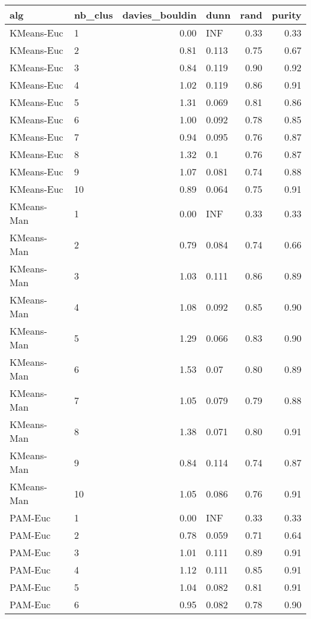 \begin{table}[ht]
\centering
\begin{tabular}{llrlrr}
  \hline
alg & nb\_clus & davies\_bouldin & dunn & rand & purity \\ 
  \hline
KMeans-Euc & 1 & 0.00 & INF & 0.33 & 0.33 \\ 
  KMeans-Euc & 2 & 0.81 & 0.113 & 0.75 & 0.67 \\ 
  KMeans-Euc & 3 & 0.84 & 0.119 & 0.90 & 0.92 \\ 
  KMeans-Euc & 4 & 1.02 & 0.119 & 0.86 & 0.91 \\ 
  KMeans-Euc & 5 & 1.31 & 0.069 & 0.81 & 0.86 \\ 
  KMeans-Euc & 6 & 1.00 & 0.092 & 0.78 & 0.85 \\ 
  KMeans-Euc & 7 & 0.94 & 0.095 & 0.76 & 0.87 \\ 
  KMeans-Euc & 8 & 1.32 & 0.1 & 0.76 & 0.87 \\ 
  KMeans-Euc & 9 & 1.07 & 0.081 & 0.74 & 0.88 \\ 
  KMeans-Euc & 10 & 0.89 & 0.064 & 0.75 & 0.91 \\ 
  KMeans-Man & 1 & 0.00 & INF & 0.33 & 0.33 \\ 
  KMeans-Man & 2 & 0.79 & 0.084 & 0.74 & 0.66 \\ 
  KMeans-Man & 3 & 1.03 & 0.111 & 0.86 & 0.89 \\ 
  KMeans-Man & 4 & 1.08 & 0.092 & 0.85 & 0.90 \\ 
  KMeans-Man & 5 & 1.29 & 0.066 & 0.83 & 0.90 \\ 
  KMeans-Man & 6 & 1.53 & 0.07 & 0.80 & 0.89 \\ 
  KMeans-Man & 7 & 1.05 & 0.079 & 0.79 & 0.88 \\ 
  KMeans-Man & 8 & 1.38 & 0.071 & 0.80 & 0.91 \\ 
  KMeans-Man & 9 & 0.84 & 0.114 & 0.74 & 0.87 \\ 
  KMeans-Man & 10 & 1.05 & 0.086 & 0.76 & 0.91 \\ 
  PAM-Euc & 1 & 0.00 & INF & 0.33 & 0.33 \\ 
  PAM-Euc & 2 & 0.78 & 0.059 & 0.71 & 0.64 \\ 
  PAM-Euc & 3 & 1.01 & 0.111 & 0.89 & 0.91 \\ 
  PAM-Euc & 4 & 1.12 & 0.111 & 0.85 & 0.91 \\ 
  PAM-Euc & 5 & 1.04 & 0.082 & 0.81 & 0.91 \\ 
  PAM-Euc & 6 & 0.95 & 0.082 & 0.78 & 0.90 \\ 

\end{tabular}
\end{table}
